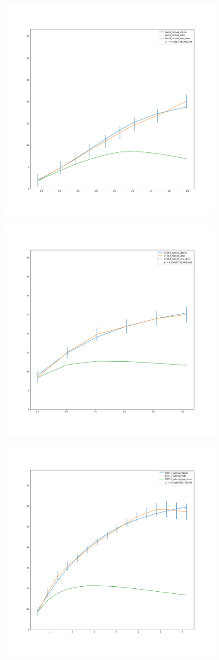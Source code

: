 \documentclass[reprint,%
 amsmath,amssymb,
 aps,
]{revtex4-1}
\begin{document}
\begin{figure}
\centering
\begin{minipage}{.5\textwidth}
  \centering
  \includegraphics[width=.49\linewidth]{figures/CamB_rotmod_XueSofue.png}
  \label{fig:test1}
\end{minipage}%
\begin{minipage}{.5\textwidth}
  \centering
  \includegraphics[width=.49\linewidth]{figures/D564-8_rotmod_XueSofue.png}
  \label{fig:test2}
\end{minipage}
\begin{minipage}{.5\textwidth}
  \centering
  \includegraphics[width=.4\linewidth]{figures/D631-7_rotmod_XueSofue.png}

\end{minipage}
\end{figure}
\end{document}
